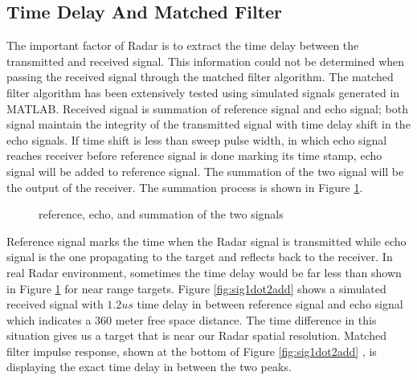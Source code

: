 \documentclass[letterpaper, 12 pt, conference]{report}
\numberwithin{figure}{section}
\begin{document}
\begin{appendices}
\subsection{Time Delay And Matched Filter}
\label{app:tdmf}
The important factor of Radar is to extract the time delay between the transmitted and received signal. This information could not be determined when passing the received signal through the matched filter algorithm. The matched filter algorithm has been extensively tested using simulated signals generated in MATLAB. Received signal is summation of reference signal and echo signal; both signal maintain the integrity of the transmitted signal with time delay shift in the echo signals. If time shift is less than sweep pulse width, in which echo signal reaches receiver before reference signal is done marking its time stamp, echo signal will be added to reference signal. The summation of the two signal will be the output of the receiver. The summation process is shown in Figure \ref{fig:sigadd}.\\
\begin{figure}[h]
\centering{}
\caption{reference, echo, and summation of the two signals}
\label{fig:sigadd}
\end{figure}
Reference signal marks the time when the Radar signal is transmitted while echo signal is the one propagating to the target and reflects back to the receiver. In real Radar environment, sometimes the time delay would be far less than shown in Figure \ref{fig:sigadd} for near range targets. Figure \ref{fig:sig1dot2add} shows a simulated received signal with $1.2us$ time delay in between reference signal and echo signal which indicates a 360 meter free space distance. The time difference in this situation gives us a target that is near our Radar spatial resolution. Matched filter impulse response, shown at the bottom of Figure \ref{fig:sig1dot2add} , is displaying the exact time delay in between the two peaks.\\
\begin{figure}[h]

\end{figure}
\end{appendices}
\end{document}
